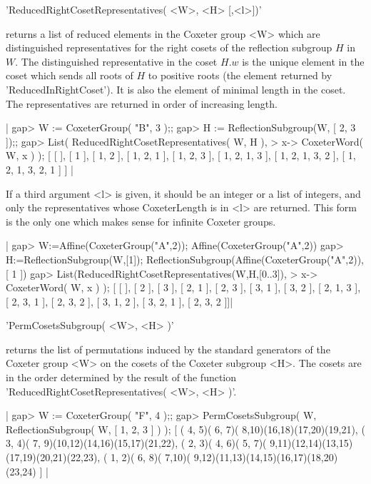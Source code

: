 'ReducedRightCosetRepresentatives( <W>, <H> [,<l>])'

returns a  list of reduced elements  in the Coxeter group  <W> which are
distinguished  representatives for  the right  cosets of  the reflection
subgroup $H$ in $W$. The distinguished representative in the coset $H.w$
is the  unique element  in the  coset which  sends all  roots of  $H$ to
positive roots  (the element  returned by 'ReducedInRightCoset').  It is
also the element of minimal length in the coset. The representatives are
returned in order of increasing length.

|    gap> W := CoxeterGroup( "B", 3 );;
    gap> H := ReflectionSubgroup(W, [ 2, 3 ]);;
    gap> List( ReducedRightCosetRepresentatives( W, H ),
    >                                x-> CoxeterWord( W, x ) );
    [ [  ], [ 1 ], [ 1, 2 ], [ 1, 2, 1 ], [ 1, 2, 3 ], [ 1, 2, 1, 3 ],
      [ 1, 2, 1, 3, 2 ], [ 1, 2, 1, 3, 2, 1 ] ] |

If  a third argument  <l> is given,  it should be  an integer or  a list of
integers,  and only the  representatives whose CoxeterLength  is in <l> are
returned.  This form is the only one which makes sense for infinite Coxeter
groups.

|    gap> W:=Affine(CoxeterGroup("A",2));                                   
    Affine(CoxeterGroup("A",2))
    gap> H:=ReflectionSubgroup(W,[1]);
    ReflectionSubgroup(Affine(CoxeterGroup("A",2)), [ 1 ])
    gap> List(ReducedRightCosetRepresentatives(W,H,[0..3]),
    >                                x-> CoxeterWord( W, x ) );
    [ [  ], [ 2 ], [ 3 ], [ 2, 1 ], [ 2, 3 ], [ 3, 1 ], [ 3, 2 ], 
      [ 2, 1, 3 ], [ 2, 3, 1 ], [ 2, 3, 2 ], [ 3, 1, 2 ], [ 3, 2, 1 ], 
      [ 2, 3, 2 ]]|


'PermCosetsSubgroup( <W>, <H> )'

returns the  list of permutations induced  by  the standard generators of
the Coxeter  group <W> on  the cosets of the Coxeter  subgroup  <H>.  The
cosets  are  in the   order determined by   the  result of   the function
'ReducedRightCosetRepresentatives( <W>, <H> )'.

|    gap> W := CoxeterGroup( "F", 4 );;
    gap> PermCosetsSubgroup( W, ReflectionSubgroup( W, [ 1, 2, 3 ] ) );
    [ ( 4, 5)( 6, 7)( 8,10)(16,18)(17,20)(19,21),
      ( 3, 4)( 7, 9)(10,12)(14,16)(15,17)(21,22),
      ( 2, 3)( 4, 6)( 5, 7)( 9,11)(12,14)(13,15)(17,19)(20,21)(22,23),
      ( 1, 2)( 6, 8)( 7,10)( 9,12)(11,13)(14,15)(16,17)(18,20)(23,24) ] |

